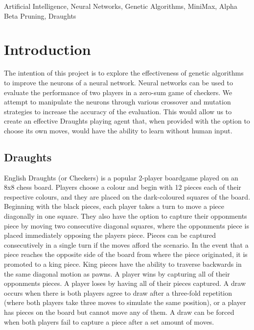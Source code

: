 \documentclass[12pt,a4paper]{article}
\begin{document}
\begin{keywords}
Artificial Intelligence, Neural Networks, Genetic Algorithms, MiniMax, Alpha Beta Pruning, Draughts

\end{keywords}





\section{Introduction}

    The intention of this project is to explore the effectiveness of genetic algorithms to improve the neurons of a neural network. Neural networks can be used to evaluate the performance of two players in a zero-sum game of checkers. We attempt to manipulate the neurons through various crossover and mutation strategies to increase the accuracy of the evaluation. This would allow us to create an effective Draughts playing agent that, when provided with the option to choose its own moves, would have the ability to learn without human input.

\subsection*{Draughts}

    English Draughts (or Checkers) is a popular 2-player boardgame played on an 8x8 chess board. Players choose a colour and begin with 12 pieces each of their respective colours, and they are placed on the dark-coloured squares of the board. Beginning with the black pieces, each player takes a turn to move a piece diagonally in one square. They also have the option to capture their opponments piece by moving two consecutive diagonal squares, where the opponments piece is placed immediately opposing the players piece. Pieces can be captured consecutively in a single turn if the moves afford the scenario. In the event that a piece reaches the opposite side of the board from where the piece originated, it is promoted to a king piece. King pieces have the ability to traverse backwards in the same diagonal motion as pawns. A player wins by capturing all of their opponments pieces. A player loses by having all of their pieces captured. A draw occurs when there is both players agree to draw after a three-fold repetition (where both players take three moves to simulate the same position), or a player has pieces on the board but cannot move any of them. A draw can be forced when both players fail to capture a piece after a set amount of moves.
\end{document}
